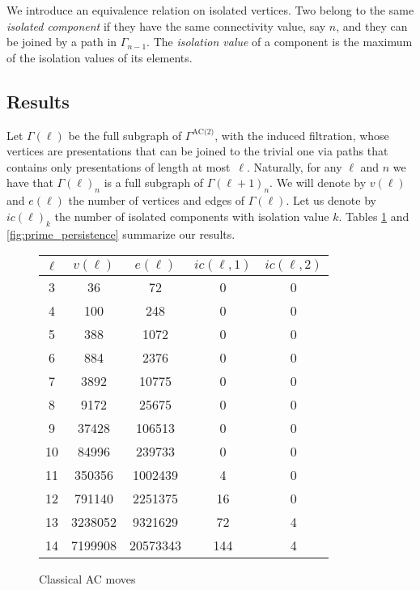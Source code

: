 We introduce an equivalence relation on isolated vertices.
Two belong to the same \textit{isolated component} if they have the same connectivity value, say $n$, and they can be joined by a path in $\Gamma_{n-1}$.
The \textit{isolation value} of a component is the maximum of the isolation values of its elements.

\subsection{Results}

Let $\Gamma(\ell)$ be the full subgraph of $\Gamma^{\text{AC(2)}}$, with the induced filtration, whose vertices are presentations that can be joined to the trivial one via paths that contains only presentations of length at most~$\ell$.
Naturally, for any $\ell$ and $n$ we have that $\Gamma(\ell)_n$ is a full subgraph of $\Gamma(\ell+1)_n$.
We will denote by $v(\ell)$ and $e(\ell)$ the number of vertices and edges of $\Gamma(\ell)$.
Let us denote by $ic(\ell)_k$ the number of isolated components with isolation value $k$.
Tables \ref{fig:classical_persistence} and \ref{fig:prime_persistence} summarize our results.

\begin{figure}
	\begin{tabular}{|c|c|c|c|c|}
		\hline
		$\ell$ & $v(\ell)$ & $e(\ell)$ & $ic(\ell,1)$ & $ic(\ell,2)$ \\ \hline
		3 & 36 & 72 & 0 & 0 \\ \hline
		4 & 100 & 248 & 0 & 0 \\ \hline
		5 & 388 & 1072 & 0 & 0 \\ \hline
		6 & 884 & 2376 & 0 & 0 \\ \hline
		7 & 3892 & 10775 & 0 & 0 \\ \hline
		8 & 9172 & 25675 & 0 & 0 \\ \hline
		9 & 37428 & 106513 & 0 & 0 \\ \hline
		10 & 84996 & 239733 & 0 & 0 \\ \hline
		11 & 350356 & 1002439 & 4 & 0 \\ \hline
		12 & 791140 & 2251375 & 16 & 0 \\ \hline
		13 & 3238052 & 9321629 & 72 & 4 \\ \hline
		14 & 7199908 & 20573343 & 144 & 4 \\ \hline
	\end{tabular}
	\caption{Classical AC moves}
	\label{fig:classical_persistence}
\end{figure}

